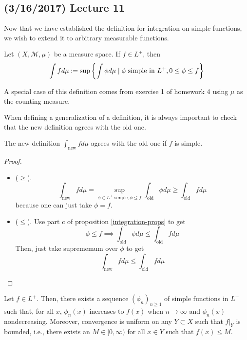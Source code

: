 \documentclass[11pt,leqno,oneside]{amsbook}
\numberwithin{thm}{section}
\newcommand{\M}{\mathcal{M}}
\begin{document}
\subsection*{(3/16/2017) Lecture 11}
Now that we have established the definition for integration on simple
functions, we wish to extend it to arbitrary measurable functions.
\begin{defn}
  Let $(X,\M,\mu)$ be a measure space. If $f \in L^+$, then \[
    \int f d\mu := \sup \left\{ \int \phi d\mu \mid \phi \text{ simple
        in } L^+, 0 \leq \phi \leq f \right\}
  \]
\end{defn}
\begin{example}
  A special case of this definition comes from exercise 1 of homework
  4 using $\mu$ as the counting measure.
\end{example}
When defining a generalization of a definition, it is always important
to check that the new definition agrees with the old one.
\begin{prop}
  The new definition $\int_{\text{new}} f d\mu$  agrees with the old
  one if $f$ is simple.
\end{prop}
\begin{proof}
  \begin{itemize}
  \item ($\geq$). \[
      \int_{\text{new}} f d\mu = \sup_{\phi \in L^+ \text{ simple},
        \phi \leq f} \int_{\text{old}} \phi d\mu \geq
      \int_{\text{old}} f d\mu
    \]
    because one can just take $\phi = f$.
  \item ($\leq$). Use part c of proposition \ref{integration-props} to get \[
      \phi \leq f \implies \int_{\text{old}} \phi d \mu \leq
      \int_{\text{old}} f d\mu
    \]
    Then, just take suprememum over $\phi$ to get \[
      \int_{\text{new}} f d\mu \leq \int_{\text{old}} f d\mu
    \]
  \end{itemize}
\end{proof}
\begin{thm}
  Let $f \in L^+$. Then, there exists a sequence $(\phi_n)_{n \geq 1}$
  of simple functions in $L^+$ such that, for all $x$, $\phi_n(x)$
  increases to $f(x)$ when $n \to \infty$ and $\phi_n(x)$
  nondecreasing. Moreover, convergence is uniform on any $Y \subset X$
  such that $f|_Y$ is bounded, i.e., there exists an $M \in
  [0,\infty)$ for all $x \in Y$ such that $f(x) \leq M$. 
\end{thm}
\end{document}
